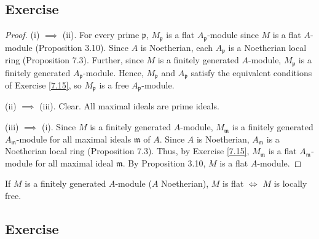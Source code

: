 \subsection{Exercise}\label{7.16}

\begin{proof}
(i) $\implies$ (ii). For every prime $\mathfrak{p}$, $M_{\mathfrak{p}}$ is a flat $A_{\mathfrak{p}}$-module since $M$ is a flat $A$-module (Proposition 3.10). Since $A$
is Noetherian, each $A_{\mathfrak{p}}$ is a Noetherian local ring (Proposition 7.3). Further, since $M$ is a finitely generated $A$-module, $M_{\mathfrak{p}}$ is a finitely 
generated $A_{\mathfrak{p}}$-module. Hence, $M_{\mathfrak{p}}$ and $A_{\mathfrak{p}}$ satisfy the equivalent conditions of Exercise \ref{7.15}, so $M_{\mathfrak{p}}$ is a 
free $A_{\mathfrak{p}}$-module.

(ii) $\implies$ (iii). Clear. All maximal ideals are prime ideals.

(iii) $\implies$ (i). Since $M$ is a finitely generated $A$-module, $M_{\mathfrak{m}}$ is a finitely generated $A_{\mathfrak{m}}$-module for all maximal ideals $\mathfrak{m}$
of $A$. Since $A$ is Noetherian, $A_{\mathfrak{m}}$ is a Noetherian local ring (Proposition 7.3). Thus, by Exercise \ref{7.15}, $M_{\mathfrak{m}}$ is a flat 
$A_{\mathfrak{m}}$-module for all maximal ideal $\mathfrak{m}$. By Proposition 3.10, $M$ is a flat $A$-module.
\end{proof}

\begin{remark}
If $M$ is a finitely generated $A$-module ($A$ Noetherian), $M$ is flat $\iff$ $M$ is locally free. 
\end{remark}

\subsection{Exercise}\label{7.17}

